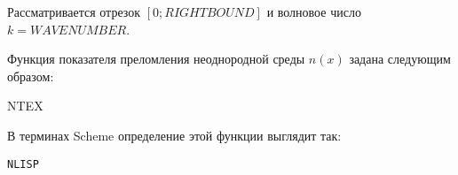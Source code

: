 Рассматривается отрезок $[0; RIGHTBOUND]$ и волновое число $k=WAVENUMBER$.

Функция показателя преломления неоднородной среды $n(x)$ задана следующим
образом:

NTEX

В терминах Scheme определение этой функции выглядит так:

\begin{lstlisting}[frame=tbrl,frameround=tttt]
NLISP
\end{lstlisting}